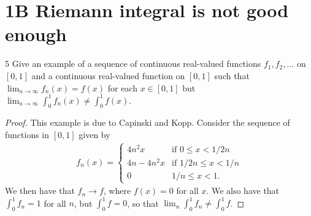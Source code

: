 \section{1B Riemann integral is not good enough}


\begin{exercise}{5}
Give an example of a sequence of continuous real-valued functions $f_1,f_2,\dots$ on $[0,1]$ and a continuous real-valued function on $[0,1]$ such that $\lim_{n\to\infty} f_n(x)= f(x)$ for each $x\in [0,1]$ but $\lim_{n\to\infty}\int_0^1 f_n(x) \neq \int_0^1 f(x)$.
\end{exercise}
\begin{proof}
This example is due to Capinski and Kopp.
Consider the sequence of functions in $[0,1]$ given by
\begin{align*}
    f_n(x) =
    \begin{cases}
        4n^2x &\text{if }0\leq x<1/2n\\
        4n-4n^2x &\text{if }1/2n\leq x < 1/n\\
        0 &1/n\leq x < 1.
    \end{cases}
\end{align*}
We then have that $f_n\to f$, where $f(x)=0$ for all $x$.
We also have that $\int_0^1 f_n=1$ for all $n$, but $\int_0^1 f=0$, so that $\lim_n \int_0^1 f_n \neq \int_0^1 f$.
\end{proof} 
